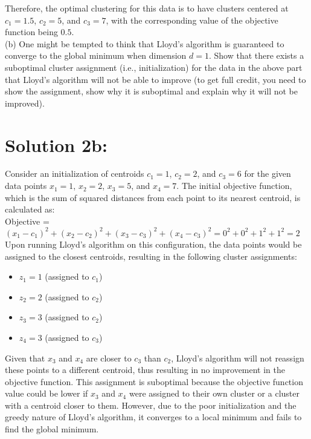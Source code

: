 \documentclass[10pt]{article}
\begin{document}
Therefore, the optimal clustering for this data is to have clusters centered at \( c_1 = 1.5 \), \( c_2 = 5 \), and \( c_3 = 7 \), with the corresponding value of the objective function being \( 0.5 \). \\

(b) One might be tempted to think that Lloyd's algorithm is guaranteed to converge to the global minimum when dimension $d=1$. Show that there exists a suboptimal cluster assignment (i.e., initialization) for the data in the above part that Lloyd's algorithm will not be able to improve (to get full credit, you need to show the assignment, show why it is suboptimal and explain why it will not be improved).

\section*{Solution 2b:}
Consider an initialization of centroids \( c_1 = 1 \), \( c_2 = 2 \), and \( c_3 = 6 \) for the given data points \( x_1 = 1 \), \( x_2 = 2 \), \( x_3 = 5 \), and \( x_4 = 7 \). The initial objective function, which is the sum of squared distances from each point to its nearest centroid, is calculated as: \\


Objective = $(x_1 - c_1)^2 + (x_2 - c_2)^2 + (x_3 - c_3)^2 + (x_4 - c_3)^2 = 0^2 + 0^2 + 1^2 + 1^2 = 2$ \\

Upon running Lloyd's algorithm on this configuration, the data points would be assigned to the closest centroids, resulting in the following cluster assignments:
\begin{itemize}
\item \( z_1 = 1 \) (assigned to \( c_1 \))
\item \( z_2 = 2 \) (assigned to \( c_2 \))
\item \( z_3 = 3 \) (assigned to \( c_2 \))
\item \( z_4 = 3 \) (assigned to \( c_3 \))
\end{itemize}

Given that \( x_3 \) and \( x_4 \) are closer to \( c_3 \) than \( c_2 \), Lloyd's algorithm will not reassign these points to a different centroid, thus resulting in no improvement in the objective function. This assignment is suboptimal because the objective function value could be lower if \( x_3 \) and \( x_4 \) were assigned to their own cluster or a cluster with a centroid closer to them. However, due to the poor initialization and the greedy nature of Lloyd's algorithm, it converges to a local minimum and fails to find the global minimum. \\
\end{document}

